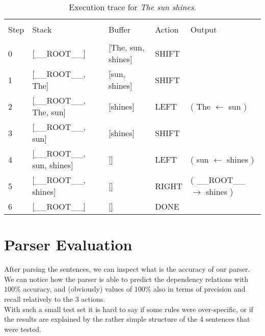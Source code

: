 \documentclass[
12pt,
a4paper,
oneside,
headinclude,
footinclude]{article}
\begin{document}
    
    \begin{center}
    \begin{table}[H]   
        \hspace*{-2.0cm}
        \begin{tabular}{l p{5cm} p{5cm} l l} %
            \hline
            \hline 
            \\[-1.5ex]
            \textcolor{BrickRed}{Step} & \textcolor{BrickRed}{Stack} & \textcolor{BrickRed}{Buffer} & \textcolor{BrickRed}{Action} & \textcolor{BrickRed}{Output}\\ [0.5ex]
            \hline %
            \\[-1.5ex]
            0 & [\_\_ROOT\_\_] & [The, sun, shines] & SHIFT & \\ 
            1 & [\_\_ROOT\_\_, The] & [sun, shines] & SHIFT & \\ 
            2 & [\_\_ROOT\_\_, The, sun] & [shines] & LEFT & ( The $\leftarrow$ sun )\\ 
            3 & [\_\_ROOT\_\_, sun] & [shines] & SHIFT & \\ 
            4 & [\_\_ROOT\_\_, sun, shines] & [] & LEFT & ( sun $\leftarrow$ shines )\\ 
            5 & [\_\_ROOT\_\_, shines] & [] & RIGHT & ( \_\_ROOT\_\_ $\rightarrow$ shines )\\ 
            6 & [\_\_ROOT\_\_] & [] & DONE &     
            \\[1ex] %
            \hline %
        \end{tabular}
        \caption{\label{tab:trace-2}Execution trace for \textit{The sun shines}.}
    \end{table} 
    \end{center}
    
    \section{Parser Evaluation}
    After parsing the sentences, we can inspect what is the accuracy of our parser. We can notice how the parser is able to predict the dependency relations with $100\%$ accuracy, and (obviously) values of $100\%$ also in terms of precision and recall relatively to the 3 actions. \\
    With such a small test set it is hard to say if some rules were over-specific, or if the results are explained by the rather simple structure of the 4 sentences that were tested.
    
\end{document}
